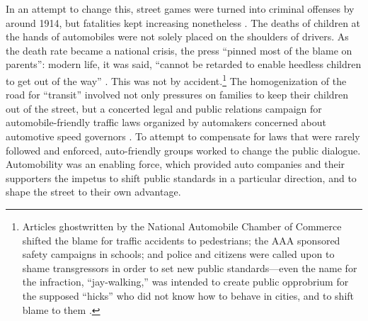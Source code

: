In an attempt to change this, street games were turned into
criminal offenses by around 1914, but fatalities kept increasing nonetheless \cite[p.
  38]{zelizer}. The deaths of children at the hands of
automobiles were not solely placed on the shoulders of drivers. As the
death rate became a national crisis, the
press ``pinned most of the blame on parents'': modern life, it
was said, ``cannot be retarded to enable heedless children to get out
of the way'' \cite[p. 37]{zelizer}. This was not by accident.\footnote{Articles
ghostwritten by the National Automobile Chamber of Commerce shifted
the blame for traffic accidents to pedestrians; the AAA sponsored
safety campaigns in schools; and police and citizens were called upon
to shame transgressors in order to set new public standards---even the
name for the infraction, ``jay-walking,'' was intended to create
public opprobrium for the supposed ``hicks'' who did not know how to
behave in cities, and to shift blame to them \cite{voxNorton}.} The homogenization of the road
for ``transit'' \cite[p. 73]{lochlannjain} involved not only
pressures on families to keep their children out of the street, but a
concerted legal and public relations campaign for automobile-friendly
traffic laws organized by automakers concerned about automotive speed
governors \cite{voxNorton}. To attempt to
compensate for laws that were rarely followed and enforced,
auto-friendly groups worked to change the public dialogue.
Automobility was an enabling 
force, which provided auto companies and their supporters the impetus
to shift public standards in a particular direction, and to shape the
street to their own advantage.


